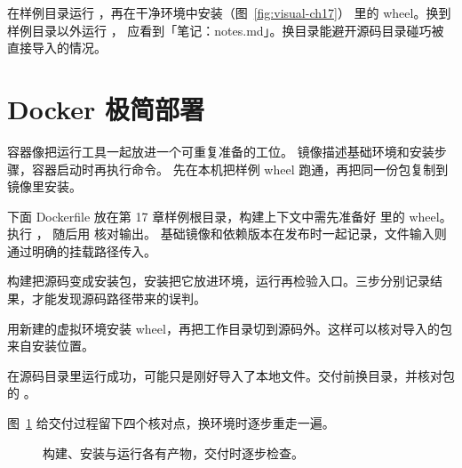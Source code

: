 在样例目录运行 ，再在干净环境中安装（图~\ref{fig:visual-ch17}）
 里的 wheel。换到样例目录以外运行 ，
应看到「笔记：notes.md」。换目录能避开源码目录碰巧被直接导入的情况。

\section{Docker 极简部署}

容器像把运行工具一起放进一个可重复准备的工位。
镜像描述基础环境和安装步骤，容器启动时再执行命令。
先在本机把样例 wheel 跑通，再把同一份包复制到镜像里安装。

下面 Dockerfile 放在第 17 章样例根目录，构建上下文中需先准备好
 里的 wheel。执行 ，
随后用  核对输出。
基础镜像和依赖版本在发布时一起记录，文件输入则通过明确的挂载路径传入。

\begin{myunderstanding}
构建把源码变成安装包，安装把它放进环境，运行再检验入口。三步分别记录结果，才能发现源码路径带来的误判。
\end{myunderstanding}

\begin{pycharmpractice}
用新建的虚拟环境安装 wheel，再把工作目录切到源码外。这样可以核对导入的包来自安装位置。
\end{pycharmpractice}

\begin{pitfall}
在源码目录里运行成功，可能只是刚好导入了本地文件。交付前换目录，并核对包的 。
\end{pitfall}
图~\ref{fig:chapter-17-flow} 给交付过程留下四个核对点，换环境时逐步重走一遍。
\begin{figure}[htbp]
  \centering
  \caption{构建、安装与运行各有产物，交付时逐步检查。}
  \label{fig:chapter-17-flow}
\end{figure}

